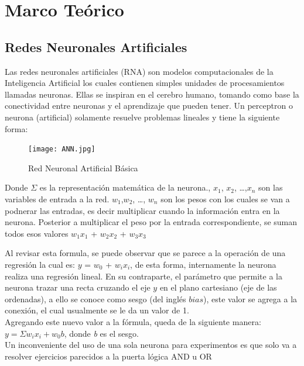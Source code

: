 \chapter{Marco Teórico}

    \section{Redes Neuronales Artificiales}
    	
    	
        Las redes neuronales artificiales (RNA) son modelos computacionales de la Inteligencia Artificial los cuales contienen simples
        unidades de procesamientos llamadas neuronas.  Ellas se inspiran en el cerebro humano, tomando como base la conectividad entre neuronas y el aprendizaje que pueden tener.  Un perceptron o neurona (artificial) solamente resuelve problemas lineales y tiene la 
        siguiente forma:
        \begin{figure}[H]
            \centering
            \texttt{[image: ANN.jpg]}
            \caption{Red Neuronal Artificial B\'asica}
            \label{fig:fig1}
        \end{figure}

       Donde $\Sigma$ es la representaci\'on matem\'atica de la neurona.,  $x_1$, $x_2$,  \dots  ,$x_n$ son las variables de entrada a la red.  $w_1$,$w_2$,  \dots , $w_n$ son los pesos con los cuales se van a podnerar las entradas, es decir multiplicar cuando la información entra en la neurona. Posterior a multiplicar el peso por la entrada correspondiente,  se suman todos esos valores $w_1$$x_1$ + $w_2$$x_2$ + $w_3$$x_3$
        
        Al revisar esta formula, se puede observar que se parece a la operaci\'on de una regresi\'on 
        la cual es:  $y$ = $w_0$ + $w_i$$x_i$,  de esta forma, internamente la neurona realiza una regresi\'on lineal. En su contraparte, el parámetro que permite a la neurona trazar una recta cruzando el eje $y$ en el plano cartesiano (eje de las ordenadas), a ello se conoce como sesgo (del inglés $bias$),  este valor se agrega a la conexi\'on, el cual usualmente se le da un valor de 1. \\
        Agregando este nuevo valor a la f\'ormula, queda de la siguiente manera: $ y = \Sigma w_i x_i + w_0 b$,  donde \textit{b} es el sesgo. \\
        
        Un inconveniente del uso de una sola neurona para experimentos es que solo 
        va a resolver ejercicios parecidos a la puerta l\'ogica AND u OR 
        
